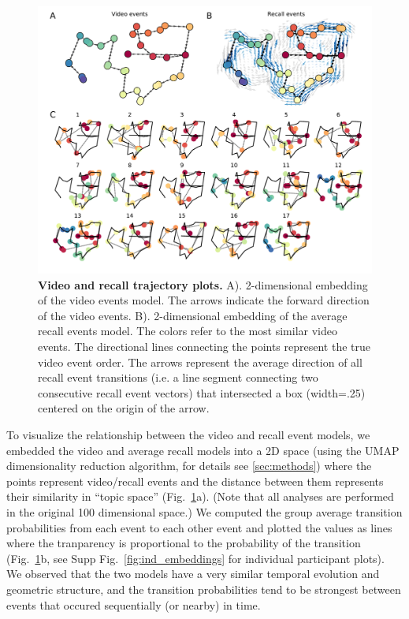 \documentclass{article}
\begin{document}
{\begin{figure}[t!]
\centering
\includegraphics[width=1\textwidth]{figs/4_trajectory.pdf}
\caption{\small \textbf{Video and recall trajectory plots.} A). 2-dimensional embedding of the video events model. The arrows indicate the forward direction of the video events. B). 2-dimensional embedding of the average recall events model.  The colors refer to the most similar video events. The directional lines connecting the points represent the true video event order. The arrows represent the average direction of all recall event transitions (i.e. a line segment connecting two consecutive recall event vectors) that intersected a box (width=.25) centered on the origin of the arrow.}
\label{fig:trajectory}
\end{figure}

To visualize the relationship between the video and recall event models, we embedded the video and average recall models into a 2D space (using the UMAP dimensionality reduction algorithm, for details see \ref{sec:methods}) where the points represent video/recall events and the distance between them represents their similarity in ``topic space'' (Fig.~\ref{fig:trajectory}a). (Note that all analyses are performed in the original 100 dimensional space.) We computed the group average transition probabilities from each event to each other event and plotted the values as lines where the tranparency is proportional to the probability of the transition (Fig.~\ref{fig:trajectory}b, see Supp Fig.~\ref{fig:ind_embeddings} for individual participant plots).  We observed that the two models have a very similar temporal evolution and geometric structure, and the transition probabilities tend to be strongest between events that occured sequentially (or nearby) in time.

}
\end{document}
